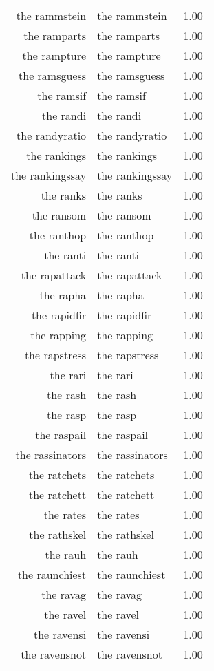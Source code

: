 \begin{table}[ht]
\begin{tabular}{rlr}
  the rammstein & the rammstein & 1.00 \\ 
  the ramparts & the ramparts & 1.00 \\ 
  the rampture & the rampture & 1.00 \\ 
  the ramsguess & the ramsguess & 1.00 \\ 
  the ramsif & the ramsif & 1.00 \\ 
  the randi & the randi & 1.00 \\ 
  the randyratio & the randyratio & 1.00 \\ 
  the rankings & the rankings & 1.00 \\ 
  the rankingssay & the rankingssay & 1.00 \\ 
  the ranks & the ranks & 1.00 \\ 
  the ransom & the ransom & 1.00 \\ 
  the ranthop & the ranthop & 1.00 \\ 
  the ranti & the ranti & 1.00 \\ 
  the rapattack & the rapattack & 1.00 \\ 
  the rapha & the rapha & 1.00 \\ 
  the rapidfir & the rapidfir & 1.00 \\ 
  the rapping & the rapping & 1.00 \\ 
  the rapstress & the rapstress & 1.00 \\ 
  the rari & the rari & 1.00 \\ 
  the rash & the rash & 1.00 \\ 
  the rasp & the rasp & 1.00 \\ 
  the raspail & the raspail & 1.00 \\ 
  the rassinators & the rassinators & 1.00 \\ 
  the ratchets & the ratchets & 1.00 \\ 
  the ratchett & the ratchett & 1.00 \\ 
  the rates & the rates & 1.00 \\ 
  the rathskel & the rathskel & 1.00 \\ 
  the rauh & the rauh & 1.00 \\ 
  the raunchiest & the raunchiest & 1.00 \\ 
  the ravag & the ravag & 1.00 \\ 
  the ravel & the ravel & 1.00 \\ 
  the ravensi & the ravensi & 1.00 \\ 
  the ravensnot & the ravensnot & 1.00 \\ 

\end{tabular}
\end{table}

